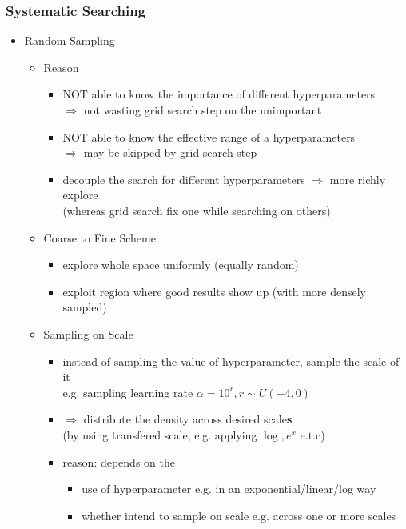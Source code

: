 \subsubsection{Systematic Searching}
\begin{itemize}
\item Random Sampling
	\begin{itemize}
	\item Reason
		\begin{itemize}
		\item NOT able to know the importance of different hyperparameters \\
		$\Rightarrow$ not wasting grid search step on the unimportant
		\item NOT able to know the effective range of a hyperparameters \\
		$\Rightarrow$ may be skipped by grid search step
		\item decouple the search for different hyperparameters $\Rightarrow$ more richly explore \\
		(whereas grid search fix one while searching on others)
		\end{itemize}
	\item Coarse to Fine Scheme
		\begin{itemize}
		\item explore whole space uniformly (equally random)
		\item exploit region where good results show up (with more densely sampled)
		\end{itemize}
	\item Sampling on Scale
		\begin{itemize}
		\item instead of sampling the value of hyperparameter, sample the scale of it \\
		e.g. sampling learning rate $\alpha = 10^r, r\sim U(-4,0)$
		\item $\Rightarrow$ distribute the density across desired scale\textbf{s} \\ 
		(by using transfered scale, e.g. applying $\log, e^x$ e.t.c)
		\item reason: depends on the 
			\begin{itemize}
			\item use of hyperparameter e.g. in an exponential/linear/log way
			\item whether intend to sample on scale e.g. across one or more scales
			\end{itemize}
		\end{itemize}
	\end{itemize}


\end{itemize}
